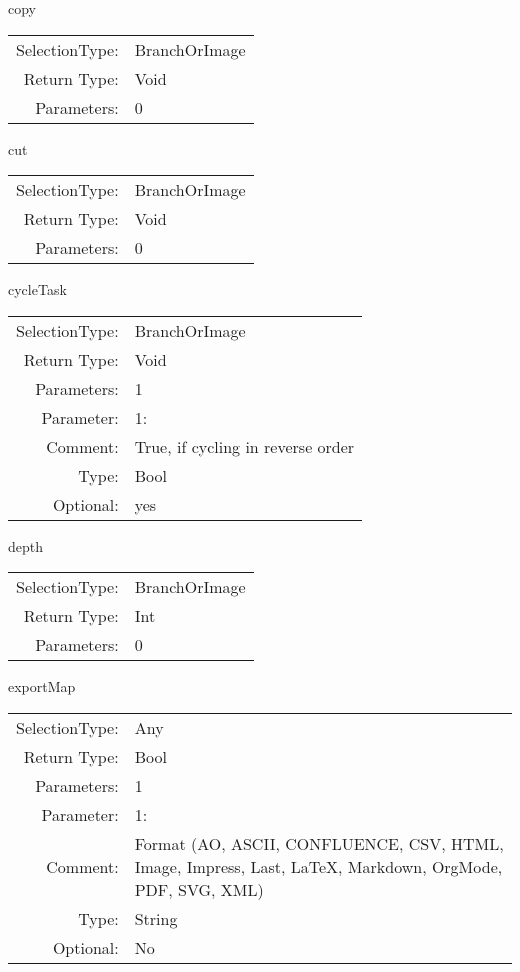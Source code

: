\item copy\\
\begin{tabular}{rl}
  SelectionType: & BranchOrImage\\
    Return Type: & Void\\
     Parameters: & 0\\
\end{tabular}

\item cut\\
\begin{tabular}{rl}
  SelectionType: & BranchOrImage\\
    Return Type: & Void\\
     Parameters: & 0\\
\end{tabular}

\item cycleTask\\
\begin{tabular}{rl}
  SelectionType: & BranchOrImage\\
    Return Type: & Void\\
     Parameters: & 1\\
   Parameter: &  1:\\
        Comment: & True, if cycling in reverse order\\
           Type: & Bool\\
       Optional: &  yes\\
\end{tabular}

\item depth\\
\begin{tabular}{rl}
  SelectionType: & BranchOrImage\\
    Return Type: & Int\\
     Parameters: & 0\\
\end{tabular}

\item exportMap\\
\begin{tabular}{rl}
  SelectionType: & Any\\
    Return Type: & Bool\\
     Parameters: & 1\\
   Parameter: &  1:\\
        Comment: & Format (AO, ASCII, CONFLUENCE, CSV, HTML, Image, Impress, Last, LaTeX, Markdown, OrgMode, PDF, SVG, XML)\\
           Type: & String\\
       Optional: &  No\\
\end{tabular}

